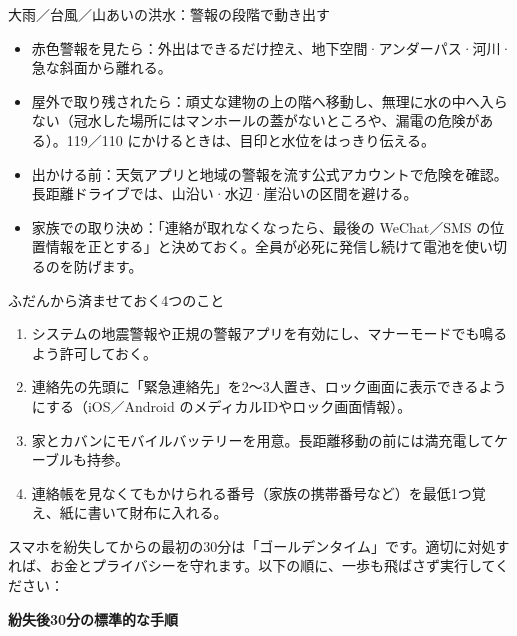 \begin{tcbwarn}{大雨／台風／山あいの洪水：警報の段階で動き出す}
\begin{itemize}
  \item 赤色警報を見たら：外出はできるだけ控え、地下空間·アンダーパス·河川·急な斜面から離れる。
  \item 屋外で取り残されたら：頑丈な建物の上の階へ移動し、無理に水の中へ入らない（冠水した場所にはマンホールの蓋がないところや、漏電の危険がある）。119／110 にかけるときは、目印と水位をはっきり伝える。
  \item 出かける前：天気アプリと地域の警報を流す公式アカウントで危険を確認。長距離ドライブでは、山沿い·水辺·崖沿いの区間を避ける。
  \item 家族での取り決め：「連絡が取れなくなったら、最後の WeChat／SMS の位置情報を正とする」と決めておく。全員が必死に発信し続けて電池を使い切るのを防げます。
\end{itemize}

\end{tcbwarn}

\begin{tcbpractice}{ふだんから済ませておく4つのこと}
\begin{enumerate}
  \item システムの地震警報や正規の警報アプリを有効にし、マナーモードでも鳴るよう許可しておく。
  \item 連絡先の先頭に「緊急連絡先」を2〜3人置き、ロック画面に表示できるようにする（iOS／Android のメディカルIDやロック画面情報）。
  \item 家とカバンにモバイルバッテリーを用意。長距離移動の前には満充電してケーブルも持参。
  \item 連絡帳を見なくてもかけられる番号（家族の携帯番号など）を最低1つ覚え、紙に書いて財布に入れる。
\end{enumerate}

\end{tcbpractice}


スマホを紛失してからの最初の30分は「ゴールデンタイム」です。適切に対処すれば、お金とプライバシーを守れます。以下の順に、一歩も飛ばさず実行してください：

\textbf{紛失後30分の標準的な手順}\par

